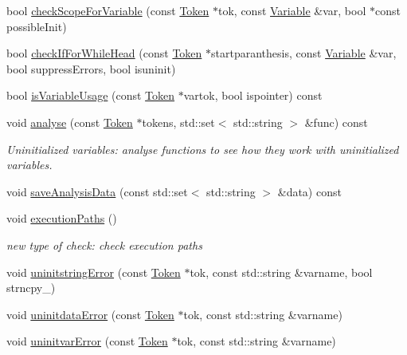 \begin{DoxyCompactItemize}
\item 
bool \hyperlink{class_check_uninit_var_a6072d9110783ea28a440c40cc6c7215d}{check\-Scope\-For\-Variable} (const \hyperlink{class_token}{Token} $\ast$tok, const \hyperlink{class_variable}{Variable} \&var, bool $\ast$const possible\-Init)
\item 
bool \hyperlink{class_check_uninit_var_a5e57cafd2fbafbcddccf7029fedf522a}{check\-If\-For\-While\-Head} (const \hyperlink{class_token}{Token} $\ast$startparanthesis, const \hyperlink{class_variable}{Variable} \&var, bool suppress\-Errors, bool isuninit)
\item 
bool \hyperlink{class_check_uninit_var_a52bc7371eaf9efe9d185a346fed4215f}{is\-Variable\-Usage} (const \hyperlink{class_token}{Token} $\ast$vartok, bool ispointer) const 
\item 
void \hyperlink{class_check_uninit_var_a57e30f23713e232a5439af4c5935c50d}{analyse} (const \hyperlink{class_token}{Token} $\ast$tokens, std\-::set$<$ std\-::string $>$ \&func) const 
\begin{DoxyCompactList}\small\item\em Uninitialized variables\-: analyse functions to see how they work with uninitialized variables. \end{DoxyCompactList}\item 
void \hyperlink{class_check_uninit_var_af8b793f3e2fec75185e7b5be9ada3a8b}{save\-Analysis\-Data} (const std\-::set$<$ std\-::string $>$ \&data) const 
\item 
void \hyperlink{class_check_uninit_var_a4de059d6df2efe1ac0811aa8c3541a6e}{execution\-Paths} ()
\begin{DoxyCompactList}\small\item\em new type of check\-: check execution paths \end{DoxyCompactList}\item 
void \hyperlink{class_check_uninit_var_add91262fdf6d9b3a66fa690d1f40d24c}{uninitstring\-Error} (const \hyperlink{class_token}{Token} $\ast$tok, const std\-::string \&varname, bool strncpy\-\_\-)
\item 
void \hyperlink{class_check_uninit_var_a4ffde982cfb9038e00df1c56a75d12f7}{uninitdata\-Error} (const \hyperlink{class_token}{Token} $\ast$tok, const std\-::string \&varname)
\item 
void \hyperlink{class_check_uninit_var_a3f08eeb8c4bfa55d946d1f5c5b4dc124}{uninitvar\-Error} (const \hyperlink{class_token}{Token} $\ast$tok, const std\-::string \&varname)
\end{DoxyCompactItemize}
